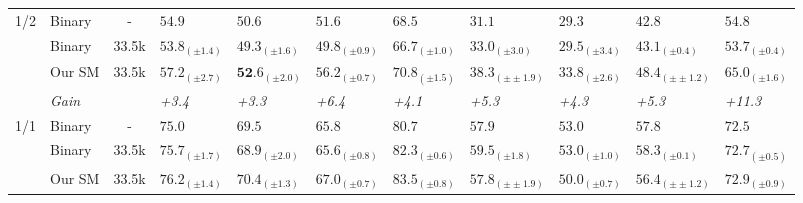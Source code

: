 \documentclass{article}
\newcommand{\gain}[1]{\textit{\color{Green}#1}}
\begin{document}
\begin{table}[t!]
{\begin{tabular}{clcllllllll}
                                                     \cmidrule(r){1-3}\cmidrule(r){8-11}\cmidrule(r){4-7}\cmidrule(r){8-11}
\multirow{4}{*}{1/2}                                 & Binary   & -                                                          &  $54.9$&        $50.6$&         $51.6$&         $68.5$&        $31.1$&         $29.3$&         $42.8$&          $54.8$\\
                                                     & Binary   & 33.5k                                                      &       $53.8_{(\pm 1.4)}$&        $49.3_{(\pm 1.6)}$&         $49.8_{(\pm 0.9)}$&         $66.7_{(\pm 1.0)}$&        $33.0_{(±3.0)}$&         $29.5_{(\pm3.4)}$&         $43.1_{(±0.4)}$&          $53.7_{(\pm0.4)}$\\
                                                     & Our SM       & 33.5k                                                      &       $\mathbf{57.2}_{(\pm 2.7)}$&        $\mathbf{52.}6_{(\pm 2.0)}$&         $\mathbf{56.2}_{(\pm 0.7)}$&         $\mathbf{70.8}_{(\pm 1.5)}$&        $\mathbf{38.3}_{(\pm±1.9)}$&         $\mathbf{33.8}_{(\pm2.6)}$&         $\mathbf{48.4}_{(\pm±1.2)}$&          $\mathbf{65.0}_{(\pm1.6)}$\\
                                                     & \quad \textit{Gain}     &                                                            &   \gain{+3.4}&        \gain{+3.3}&         \gain{+6.4}&         \gain{+4.1}&        \gain{+5.3}&         \gain{+4.3}&         \gain{+5.3}&    \gain{+11.3}\\
                                                     \cmidrule(r){1-3}\cmidrule(r){8-11}\cmidrule(r){4-7}\cmidrule(r){8-11}
\multirow{4}{*}{1/1}                                 & Binary   & -                                                          &  $75.0$&        $69.5$&         $65.8$&         $80.7$&        $57.9$&         $\mathbf{53.0}$&         $57.8$&          $72.5$\\
                                                     & Binary   & 33.5k                                                      &       $75.7_{(\pm 1.7)}$&        $68.9_{(\pm 2.0)}$&         $65.6_{(\pm 0.8)}$&         $82.3_{(\pm 0.6)}$&        $\mathbf{59.5}_{(±1.8)}$&         $\mathbf{53.0}_{(\pm1.0)}$&         $\mathbf{58.3}_{(±0.1)}$&          $72.7_{(\pm0.5)}$\\
                                                     & Our SM       & 33.5k                                                      &       $\mathbf{76.2}_{(\pm 1.4)}$&        $\mathbf{70.4}_{(\pm 1.3)}$&         $\mathbf{67.0}_{(\pm 0.7)}$&         $\mathbf{83.5}_{(\pm 0.8)}$&        $57.8_{(\pm±1.9)}$&         $50.0_{(\pm0.7)}$&         $56.4_{(\pm±1.2)}$&          $\mathbf{72.9}_{(\pm0.9)}$\\

\end{tabular}}
\end{table}
\end{document}
